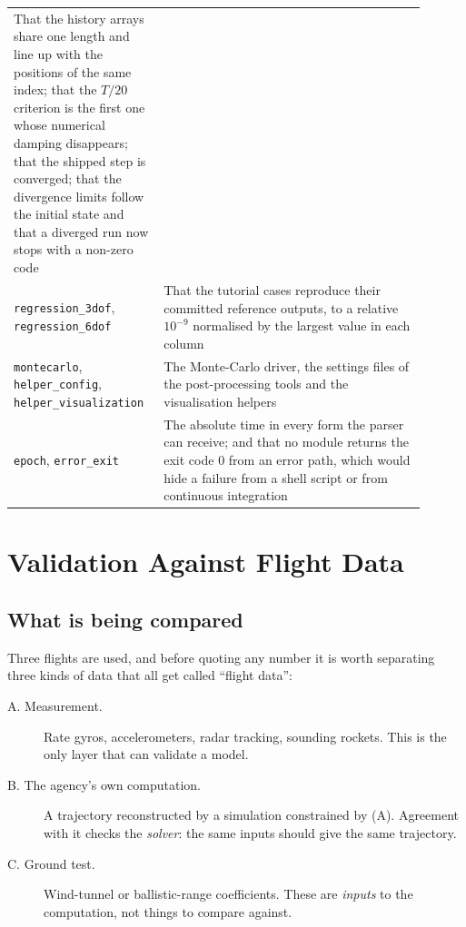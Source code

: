 \documentclass[11pt,a4paper]{article}
\begin{document}
\begin{table}[h]
\begin{center}
\begin{tabular}{>{\raggedright\arraybackslash}p{0.30\linewidth}|>{\raggedright\arraybackslash}p{0.60\linewidth}}
That the history arrays share one length and line up with the positions of the same index;
that the $T/20$ criterion is the first one whose numerical damping disappears; that the
shipped step is converged; that the divergence limits follow the initial state and that a
diverged run now stops with a non-zero code \\
\texttt{regression\_3dof}, \texttt{regression\_6dof} &
That the tutorial cases reproduce their committed reference outputs, to a relative
$10^{-9}$ normalised by the largest value in each column \\
\texttt{montecarlo}, \texttt{helper\_config}, \texttt{helper\_visualization} &
The Monte-Carlo driver, the settings files of the post-processing tools and the
visualisation helpers \\
\texttt{epoch}, \texttt{error\_exit} &
The absolute time in every form the parser can receive; and that no module returns the
exit code 0 from an error path, which would hide a failure from a shell script or from
continuous integration \\
\hline \hline
\end{tabular}
\end{center}
\end{table}

\section{Validation Against Flight Data} \label{validation}

\subsection{What is being compared}

Three flights are used, and before quoting any number it is worth separating three kinds
of data that all get called ``flight data'':

\begin{description}
\item[A. Measurement.] Rate gyros, accelerometers, radar tracking, sounding rockets. This
is the only layer that can validate a model.
\item[B. The agency's own computation.] A trajectory reconstructed by a simulation
constrained by (A). Agreement with it checks the \emph{solver}: the same inputs should
give the same trajectory.
\item[C. Ground test.] Wind-tunnel or ballistic-range coefficients. These are
\emph{inputs} to the computation, not things to compare against.
\end{description}
\end{document}
